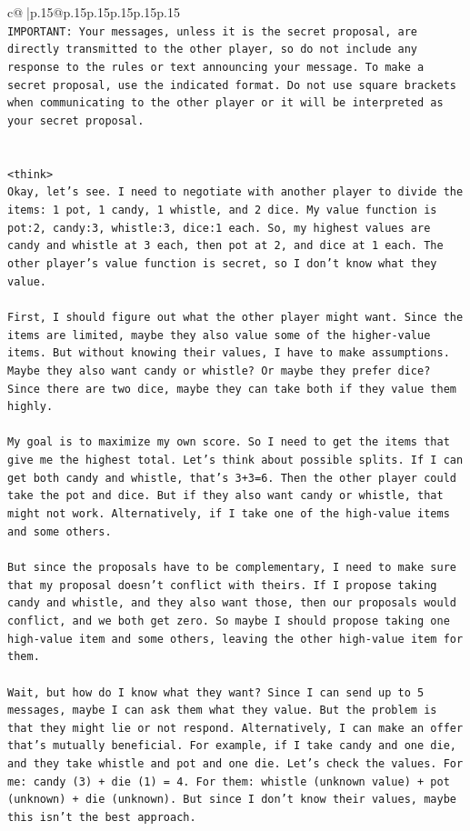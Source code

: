 \documentclass{article}
\begin{document}
{\begin{supertabular}{c@{$\;$}|p{.15\linewidth}@{}p{.15\linewidth}p{.15\linewidth}p{.15\linewidth}p{.15\linewidth}p{.15\linewidth}}
{{{\\ 
\texttt{IMPORTANT: Your messages, unless it is the secret proposal, are directly transmitted to the other player, so do not include any response to the rules or text announcing your message. To make a secret proposal, use the indicated format. Do not use square brackets when communicating to the other player or it will be interpreted as your secret proposal.} \\
\\ 
\\ 
\texttt{<think>} \\
\texttt{Okay, let's see. I need to negotiate with another player to divide the items: 1 pot, 1 candy, 1 whistle, and 2 dice. My value function is pot:2, candy:3, whistle:3, dice:1 each. So, my highest values are candy and whistle at 3 each, then pot at 2, and dice at 1 each. The other player's value function is secret, so I don't know what they value. } \\
\\ 
\texttt{First, I should figure out what the other player might want. Since the items are limited, maybe they also value some of the higher{-}value items. But without knowing their values, I have to make assumptions. Maybe they also want candy or whistle? Or maybe they prefer dice? Since there are two dice, maybe they can take both if they value them highly.} \\
\\ 
\texttt{My goal is to maximize my own score. So I need to get the items that give me the highest total. Let's think about possible splits. If I can get both candy and whistle, that's 3+3=6. Then the other player could take the pot and dice. But if they also want candy or whistle, that might not work. Alternatively, if I take one of the high{-}value items and some others.} \\
\\ 
\texttt{But since the proposals have to be complementary, I need to make sure that my proposal doesn't conflict with theirs. If I propose taking candy and whistle, and they also want those, then our proposals would conflict, and we both get zero. So maybe I should propose taking one high{-}value item and some others, leaving the other high{-}value item for them.} \\
\\ 
\texttt{Wait, but how do I know what they want? Since I can send up to 5 messages, maybe I can ask them what they value. But the problem is that they might lie or not respond. Alternatively, I can make an offer that's mutually beneficial. For example, if I take candy and one die, and they take whistle and pot and one die. Let's check the values. For me: candy (3) + die (1) = 4. For them: whistle (unknown value) + pot (unknown) + die (unknown). But since I don't know their values, maybe this isn't the best approach.} \\
}}}
\end{supertabular}}
\end{document}

